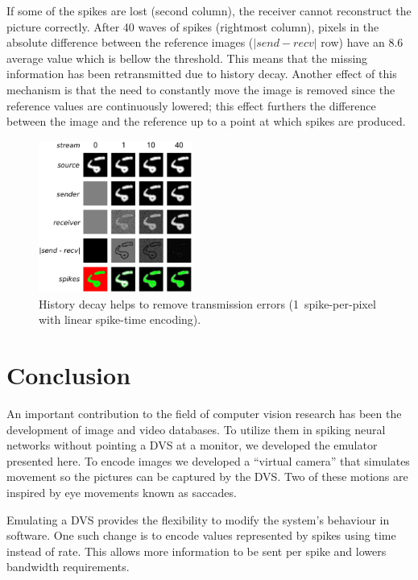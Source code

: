 \documentclass[conference]{IEEEtran}
\begin{document}
If some of the spikes are lost (second column), the receiver cannot reconstruct the picture correctly. After 40 waves of spikes (rightmost column),  pixels in the absolute difference between the reference images ($|send-recv|$ row) have an 8.6 average value which is bellow the threshold. This means that the missing information has been retransmitted due to history decay. Another effect of this mechanism is that the need to constantly move the image is removed since the reference values are continuously lowered; this effect furthers the difference between the image and the reference up to a point at which spikes are produced.

\setcounter{figure}{13} %
\begin{figure}[htb]
  \centering
  
  \includegraphics[width=0.45\textwidth]{history_decay}
  \caption{History decay helps to remove transmission errors (1~spike-per-pixel with linear spike-time encoding).}
  \label{fig:history_decay}
\end{figure}


\section{Conclusion}
\label{sec:conclusions}
An important contribution to the field of computer vision research has been the development of image and video databases. To utilize them in spiking neural networks without pointing a DVS at a monitor, we developed the emulator presented here. To encode images we developed a ``virtual camera'' that simulates movement so the pictures can be captured by the DVS. Two of these motions are inspired by eye movements known as saccades.

Emulating a DVS provides the flexibility to modify the system's behaviour in software. One such change is to encode values represented by spikes using time instead of rate. This allows more information to be sent per spike and lowers bandwidth requirements. 
\end{document}
